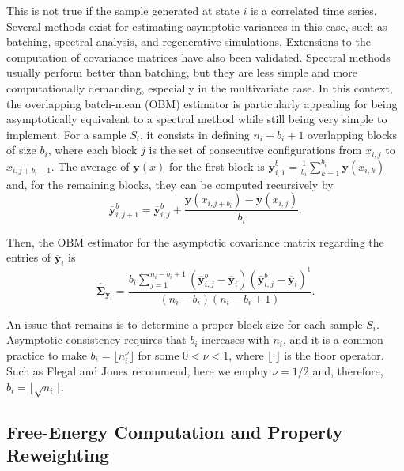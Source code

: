 \documentclass[aip,jcp,reprint,amsmath,amssymb]{revtex4-1}
\newcommand{\mt}[1]{\boldsymbol{\mathbf{#1}}}           %
\newcommand{\vt}[1]{\boldsymbol{\mathbf{#1}}}           %
\newcommand{\tr}[1]{#1^\text{t}}                        %
\begin{document}
This is not true if the sample generated at state $i$ is a correlated time series. Several methods exist for estimating asymptotic variances in this case, such as batching, spectral analysis, and regenerative simulations.\cite{Geyer_1992, Alexopoulos_2006, Flegal_2010, Doss_2014} Extensions to the computation of covariance matrices have also been validated.\cite{Vats_2015, Vats_2017} Spectral methods usually perform better than batching,\cite{Flegal_2010} but they are less simple and more computationally demanding, especially in the multivariate case.\cite{Vats_2015} In this context, the overlapping batch-mean (OBM) estimator\cite{Meketon_1984} is particularly appealing for being asymptotically equivalent to a spectral method while still being very simple to implement. For a sample $S_i$, it consists in defining $n_i-b_i+1$ overlapping blocks of size $b_i$, where each block $j$ is the set of consecutive configurations from $x_{i,j}$ to $x_{i,j+b_i-1}$. The average of $\vt y(x)$ for the first block is ${\overline{\vt y}}^b_{i,1} = \frac{1}{b_i} \sum_{k=1}^{b_i} \vt y(x_{i,k})$ and, for the remaining blocks, they can be computed recursively by
\begin{equation*}
{\overline{\vt y}}^b_{i,j+1} = {\overline{\vt y}}^b_{i,j} + \frac{\vt y(x_{i,j+b_i}) - \vt y(x_{i,j})}{b_i}.
\end{equation*}

Then, the OBM estimator for the asymptotic covariance matrix regarding the entries of $\overline{\vt y}_i$ is\cite{Meketon_1984}
\begin{equation}
\label{eq:obm asymptotic covariance}
\hat{\mt \Sigma}_{\overline{\vt y}_i} = \frac{b_i \sum\limits_{j=1}^{n_i - b_i + 1} ({\overline{\vt y}}^b_{i,j} - \overline{\vt y}_i) \tr{({\overline{\vt y}}^b_{i,j} - \overline{\vt y}_i)}}{(n_i - b_i)(n_i - b_i + 1)}.
\end{equation}

An issue that remains is to determine a proper block size for each sample $S_i$. Asymptotic consistency requires that $b_i$ increases with $n_i$, and it is a common practice to make $b_i = \lfloor n_i^\nu \rfloor$ for some $0 < \nu < 1$, where $\lfloor \cdot \rfloor$ is the floor operator. Such as Flegal and Jones\cite{Flegal_2010} recommend, here we employ $\nu = 1/2$ and, therefore, $b_i = \lfloor \sqrt{n_i} \rfloor$.

\subsection{Free-Energy Computation and Property Reweighting}
\label{sec:fep and reweighting}
\end{document}

